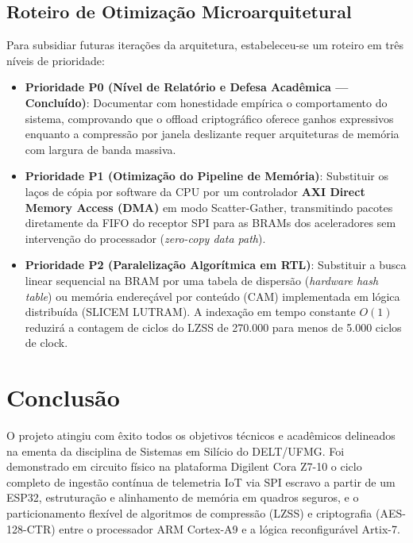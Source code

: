 \documentclass[11pt,a4paper]{article}
\begin{document}
\subsection{Roteiro de Otimização Microarquitetural}
Para subsidiar futuras iterações da arquitetura, estabeleceu-se um roteiro em três níveis de prioridade:
\begin{itemize}
  \item \textbf{Prioridade P0 (Nível de Relatório e Defesa Acadêmica --- Concluído)}: Documentar com honestidade empírica o comportamento do sistema, comprovando que o offload criptográfico oferece ganhos expressivos enquanto a compressão por janela deslizante requer arquiteturas de memória com largura de banda massiva.
  \item \textbf{Prioridade P1 (Otimização do Pipeline de Memória)}: Substituir os laços de cópia por software da CPU por um controlador \textbf{AXI Direct Memory Access (DMA)} em modo Scatter-Gather, transmitindo pacotes diretamente da FIFO do receptor SPI para as BRAMs dos aceleradores sem intervenção do processador (\textit{zero-copy data path}).
  \item \textbf{Prioridade P2 (Paralelização Algorítmica em RTL)}: Substituir a busca linear sequencial na BRAM por uma tabela de dispersão (\textit{hardware hash table}) ou memória endereçável por conteúdo (CAM) implementada em lógica distribuída (SLICEM LUTRAM). A indexação em tempo constante $O(1)$ reduzirá a contagem de ciclos do LZSS de 270.000 para menos de 5.000 ciclos de clock.
\end{itemize}

\section{Conclusão}

O projeto atingiu com êxito todos os objetivos técnicos e acadêmicos delineados na ementa da disciplina de Sistemas em Silício do DELT/UFMG. Foi demonstrado em circuito físico na plataforma Digilent Cora Z7-10 o ciclo completo de ingestão contínua de telemetria IoT via SPI escravo a partir de um ESP32, estruturação e alinhamento de memória em quadros seguros, e o particionamento flexível de algoritmos de compressão (LZSS) e criptografia (AES-128-CTR) entre o processador ARM Cortex-A9 e a lógica reconfigurável Artix-7.
\end{document}
